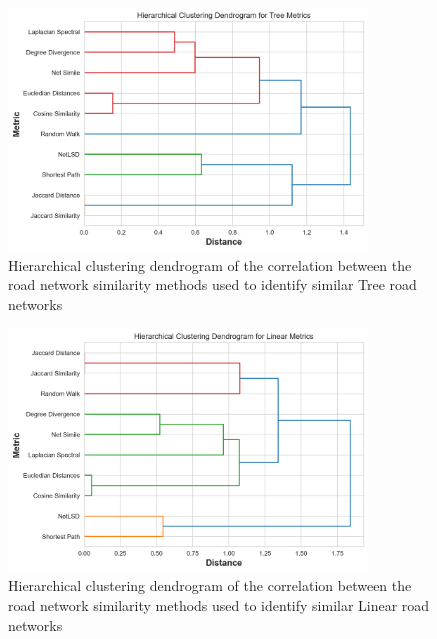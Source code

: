 \begin{figure}[!ht]
\centering
\includegraphics[width=0.85\textwidth,center]{picture/Tree/tree_metrics_dendrogram.png}
\caption[Hierarchical Clustering Dendrogram of the Correlation between the Tree Network Similarity Methods for Tree Road Networks]{Hierarchical clustering dendrogram of the correlation between the road network similarity methods used to identify similar Tree road networks}
\label{fig:Hierarchical Clustering Dendrogram of the Correlation between the Road Network Similarity Methods for Tree Road Networks}
\end{figure}

\begin{figure}[!ht]
\centering
\includegraphics[width=0.85\textwidth,center]{picture/Linear/linear_metrics_dendrogram.png}
\caption[Hierarchical Clustering Dendrogram of the Correlation between the Linear Network Similarity Methods for Linear Road Networks]{Hierarchical clustering dendrogram of the correlation between the road network similarity methods used to identify similar Linear road networks}
\label{fig:Hierarchical Clustering Dendrogram of the Correlation between the Road Network Similarity Methods for Linear Road Networks}
\end{figure}

